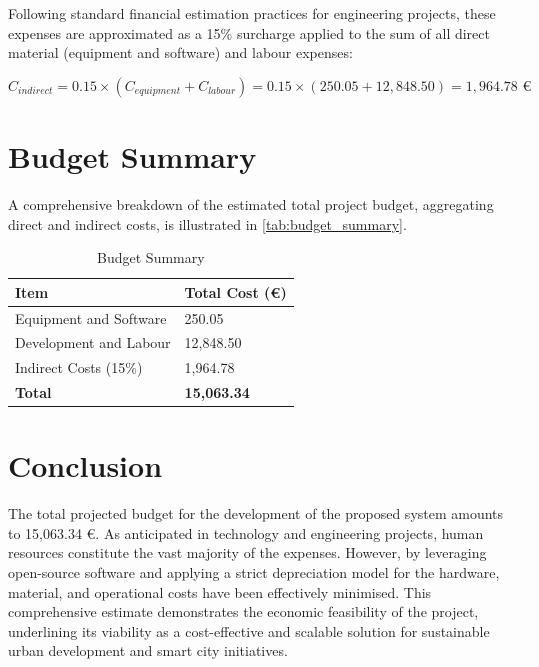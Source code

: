 Following standard financial estimation practices for engineering projects, these expenses are approximated as a 15\% surcharge applied to the sum of all direct material (equipment and software) and labour expenses:

\begin{equation}
    C_{indirect} = 0.15 \times (C_{equipment} + C_{labour}) = 0.15 \times (250.05 + 12,848.50) = 1,964.78\text{ €}
\end{equation}

\section{Budget Summary} \label{sec:budget:summary}
A comprehensive breakdown of the estimated total project budget, aggregating direct and indirect costs, is illustrated in \autoref{tab:budget_summary}.

\begin{table}[H]
    \centering
    \caption{Budget Summary}
    \label{tab:budget_summary}
    \begin{tabular}{p{}p{}}
        \toprule
        \textbf{Item} & \textbf{Total Cost (€)} \\
        \midrule
        Equipment and Software & 250.05 \\
        Development and Labour & 12,848.50 \\
        Indirect Costs (15\%) & 1,964.78 \\
        \midrule
        \textbf{Total} & \textbf{15,063.34} \\
        \bottomrule
    \end{tabular}
\end{table}

\section{Conclusion} \label{sec:budget:conclusion}
The total projected budget for the development of the proposed system amounts to 15,063.34 €. As anticipated in technology and engineering projects, human resources constitute the vast majority of the expenses. However, by leveraging open-source software and applying a strict depreciation model for the hardware, material, and operational costs have been effectively minimised. This comprehensive estimate demonstrates the economic feasibility of the project, underlining its viability as a cost-effective and scalable solution for sustainable urban development and smart city initiatives.
